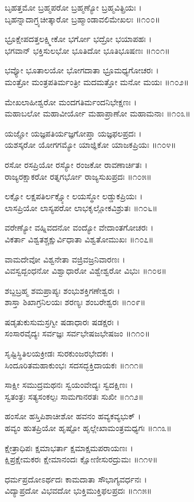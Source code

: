 ಬೃಹತ್ತಮೋ ಬ್ರಹ್ಮಪರೋ ಬ್ರಹ್ಮಣ್ಯೋ ಬ್ರಹ್ಮವಿತ್ಪ್ರಿಯಃ ।\\
ಬೃಹನ್ನಾದಾಗ್ರ್ಯಚೀತ್ಕಾರೋ ಬ್ರಹ್ಮಾಂಡಾವಲಿಮೇಖಲಃ ॥೧೦೦॥

ಭ್ರೂಕ್ಷೇಪದತ್ತಲಕ್ಷ್ಮೀಕೋ ಭರ್ಗೋ ಭದ್ರೋ ಭಯಾಪಹಃ ।\\
ಭಗವಾನ್ ಭಕ್ತಿಸುಲಭೋ ಭೂತಿದೋ ಭೂತಿಭೂಷಣಃ ॥೧೦೧॥

ಭವ್ಯೋ ಭೂತಾಲಯೋ ಭೋಗದಾತಾ ಭ್ರೂಮಧ್ಯಗೋಚರಃ ।\\
ಮಂತ್ರೋ ಮಂತ್ರಪತಿರ್ಮಂತ್ರೀ ಮದಮತ್ತೋ ಮನೋ ಮಯಃ ॥೧೦೨॥

ಮೇಖಲಾಹೀಶ್ವರೋ ಮಂದಗತಿರ್ಮಂದನಿಭೇಕ್ಷಣಃ ।\\
ಮಹಾಬಲೋ ಮಹಾವೀರ್ಯೋ ಮಹಾಪ್ರಾಣೋ ಮಹಾಮನಾಃ ॥೧೦೩॥

ಯಜ್ಞೋ ಯಜ್ಞಪತಿರ್ಯಜ್ಞಗೋಪ್ತಾ ಯಜ್ಞಫಲಪ್ರದಃ ।\\
ಯಶಸ್ಕರೋ ಯೋಗಗಮ್ಯೋ ಯಾಜ್ಞಿಕೋ ಯಾಜಕಪ್ರಿಯಃ ॥೧೦೪॥

ರಸೋ ರಸಪ್ರಿಯೋ ರಸ್ಯೋ ರಂಜಕೋ ರಾವಣಾರ್ಚಿತಃ ।\\
ರಾಜ್ಯರಕ್ಷಾಕರೋ ರತ್ನಗರ್ಭೋ ರಾಜ್ಯಸುಖಪ್ರದಃ ॥೧೦೫॥

ಲಕ್ಷೋ ಲಕ್ಷಪತಿರ್ಲಕ್ಷ್ಯೋ ಲಯಸ್ಥೋ ಲಡ್ಡುಕಪ್ರಿಯಃ ।\\
ಲಾಸಪ್ರಿಯೋ ಲಾಸ್ಯಪರೋ ಲಾಭಕೃಲ್ಲೋಕವಿಶ್ರುತಃ ॥೧೦೬॥

ವರೇಣ್ಯೋ ವಹ್ನಿವದನೋ ವಂದ್ಯೋ ವೇದಾಂತಗೋಚರಃ ।\\
ವಿಕರ್ತಾ ವಿಶ್ವತಶ್ಚಕ್ಷುರ್ವಿಧಾತಾ ವಿಶ್ವತೋಮುಖಃ ॥೧೦೭॥

ವಾಮದೇವೋ ವಿಶ್ವನೇತಾ ವಜ್ರಿವಜ್ರನಿವಾರಣಃ ।\\
ವಿವಸ್ವದ್ಬಂಧನೋ ವಿಶ್ವಾಧಾರೋ ವಿಶ್ವೇಶ್ವರೋ ವಿಭುಃ ॥೧೦೮॥

ಶಬ್ದಬ್ರಹ್ಮ ಶಮಪ್ರಾಪ್ಯಃ ಶಂಭುಶಕ್ತಿಗಣೇಶ್ವರಃ ।\\
ಶಾಸ್ತಾ ಶಿಖಾಗ್ರನಿಲಯಃ ಶರಣ್ಯಃ ಶಂಬರೇಶ್ವರಃ ॥೧೦೯॥

ಷಡೃತುಕುಸುಮಸ್ರಗ್ವೀ ಷಡಾಧಾರಃ ಷಡಕ್ಷರಃ ।\\
ಸಂಸಾರವೈದ್ಯಃ ಸರ್ವಜ್ಞಃ ಸರ್ವಭೇಷಜಭೇಷಜಂ ॥೧೧೦॥

ಸೃಷ್ಟಿಸ್ಥಿತಿಲಯಕ್ರೀಡಃ ಸುರಕುಂಜರಭೇದಕಃ ।\\
ಸಿಂದೂರಿತಮಹಾಕುಂಭಃ ಸದಸದ್ಭಕ್ತಿದಾಯಕಃ ॥೧೧೧॥

ಸಾಕ್ಷೀ ಸಮುದ್ರಮಥನಃ ಸ್ವಯಂವೇದ್ಯಃ ಸ್ವದಕ್ಷಿಣಃ ।\\
ಸ್ವತಂತ್ರಃ ಸತ್ಯಸಂಕಲ್ಪಃ ಸಾಮಗಾನರತಃ ಸುಖೀ ॥೧೧೨॥

ಹಂಸೋ ಹಸ್ತಿಪಿಶಾಚೀಶೋ ಹವನಂ ಹವ್ಯಕವ್ಯಭುಕ್ ।\\
ಹವ್ಯಂ ಹುತಪ್ರಿಯೋ ಹೃಷ್ಟೋ ಹೃಲ್ಲೇಖಾಮಂತ್ರಮಧ್ಯಗಃ ॥೧೧೩॥

ಕ್ಷೇತ್ರಾಧಿಪಃ ಕ್ಷಮಾಭರ್ತಾ ಕ್ಷಮಾಕ್ಷಮಪರಾಯಣಃ ।\\
ಕ್ಷಿಪ್ರಕ್ಷೇಮಕರಃ ಕ್ಷೇಮಾನಂದಃ ಕ್ಷೋಣೀಸುರದ್ರುಮಃ ॥೧೧೪॥

ಧರ್ಮಪ್ರದೋಽರ್ಥದಃ ಕಾಮದಾತಾ ಸೌಭಾಗ್ಯವರ್ಧನಃ ।\\
ವಿದ್ಯಾಪ್ರದೋ ವಿಭವದೋ ಭುಕ್ತಿಮುಕ್ತಿಫಲಪ್ರದಃ ॥೧೧೫॥


